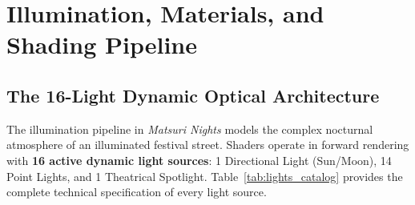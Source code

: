 \chapter{Illumination, Materials, and Shading Pipeline}
\label{chap:lighting}

\section{The 16-Light Dynamic Optical Architecture}
The illumination pipeline in \textit{Matsuri Nights} models the complex nocturnal atmosphere of an illuminated festival street. Shaders operate in forward rendering with \textbf{16 active dynamic light sources}: 1 Directional Light (Sun/Moon), 14 Point Lights, and 1 Theatrical Spotlight. Table~\ref{tab:lights_catalog} provides the complete technical specification of every light source.

